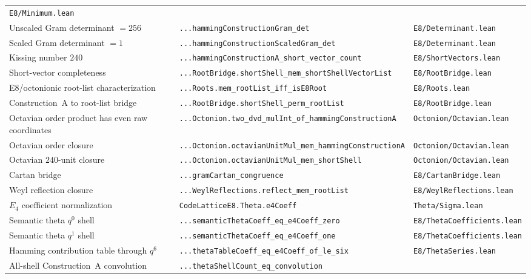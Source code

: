 \documentclass[12pt]{article}
\theoremstyle{definition}
\newcommand{\lean}[1]{\texttt{#1}}
\begin{document}
\begin{longtable}{@{}p{5.3cm}p{5.4cm}p{3.5cm}@{}}
  \lean{E8/Minimum.lean} \\[2pt]
Unscaled Gram determinant $= 256$ &
  \lean{...hammingConstructionGram\_det} &
  \lean{E8/Determinant.lean} \\[2pt]
Scaled Gram determinant $= 1$ &
  \lean{...hammingConstructionScaledGram\_det} &
  \lean{E8/Determinant.lean} \\[2pt]
Kissing number $240$ &
  \lean{...hammingConstructionA\_short\_vector\_count} &
  \lean{E8/ShortVectors.lean} \\[2pt]
Short-vector completeness &
  \lean{...RootBridge.shortShell\_mem\_shortShellVectorList} &
  \lean{E8/RootBridge.lean} \\[2pt]
E8/octonionic root-list characterization &
  \lean{...Roots.mem\_rootList\_iff\_isE8Root} &
  \lean{E8/Roots.lean} \\[2pt]
Construction~A to root-list bridge &
  \lean{...RootBridge.shortShell\_perm\_rootList} &
  \lean{E8/RootBridge.lean} \\[2pt]
Octavian order product has even raw coordinates &
  \lean{...Octonion.two\_dvd\_mulInt\_of\_hammingConstructionA} &
  \lean{Octonion/Octavian.lean} \\[2pt]
Octavian order closure &
  \lean{...Octonion.octavianUnitMul\_mem\_hammingConstructionA} &
  \lean{Octonion/Octavian.lean} \\[2pt]
Octavian $240$-unit closure &
  \lean{...Octonion.octavianUnitMul\_mem\_shortShell} &
  \lean{Octonion/Octavian.lean} \\[2pt]
Cartan bridge &
  \lean{...gramCartan\_congruence} &
  \lean{E8/CartanBridge.lean} \\[2pt]
Weyl reflection closure &
  \lean{...WeylReflections.reflect\_mem\_rootList} &
  \lean{E8/WeylReflections.lean} \\[2pt]
$E_4$ coefficient normalization &
  \lean{CodeLatticeE8.Theta.e4Coeff} &
  \lean{Theta/Sigma.lean} \\[2pt]
Semantic theta $q^0$ shell &
  \lean{...semanticThetaCoeff\_eq\_e4Coeff\_zero} &
  \lean{E8/ThetaCoefficients.lean} \\[2pt]
Semantic theta $q^1$ shell &
  \lean{...semanticThetaCoeff\_eq\_e4Coeff\_one} &
  \lean{E8/ThetaCoefficients.lean} \\[2pt]
Hamming contribution table through $q^6$ &
  \lean{...thetaTableCoeff\_eq\_e4Coeff\_of\_le\_six} &
  \lean{E8/ThetaSeries.lean} \\[2pt]
All-shell Construction~A convolution &
  \lean{...thetaShellCount\_eq\_convolution} &

\end{longtable}
\end{document}
